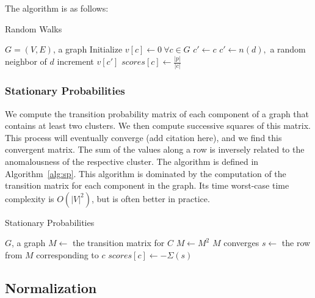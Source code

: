 The algorithm is as follows:

\begin{algorithm}[h]
    \caption{Random Walks}
    \label{alg:rw}
\begin{algorithmic}[1]
    \REQUIRE $G = (V,E)$, a graph
    \STATE Initialize $v[c] \gets 0 \ \forall c \in G$
        \STATE $c' \gets c$
            \STATE $c' \gets n(d),$ a random neighbor of $d$
            \STATE increment $v[c']$
        \ENDFOR
    \ENDFOR
        \STATE $scores[c] \gets \frac{|p|}{|c|}$
    \ENDFOR
\end{algorithmic}
\end{algorithm}

\subsubsection{Stationary Probabilities}
We compute the transition probability matrix of each component of a graph that contains at least two clusters.
We then compute successive squares of this matrix. %
This process will eventually converge (add citation here), and we find this convergent matrix.
The sum of the values along a row is inversely related to the anomalousness of the respective cluster.
The algorithm is defined in Algorithm~\ref{alg:sp}.
This algorithm is dominated by the computation of the transition matrix for each component in the graph.
Its time worst-case time complexity is $O(|V|^2)$, but is often better in practice.

\begin{algorithm}[h]
    \caption{Stationary Probabilities}
    \label{alg:sp}
\begin{algorithmic}[1]
    \REQUIRE $G$, a graph
        \STATE $M \gets$ the transition matrix for $C$
        \REPEAT
            \STATE $M \gets M^2$
        \UNTIL $M$ converges
            \STATE $s \gets $ the row from $M$ corresponding to $c$
            \STATE $scores[c] \gets -\Sigma(s)$ 
        \ENDFOR
    \ENDFOR
\end{algorithmic}
\end{algorithm}


\subsection{Normalization}
\label{subsec:methods:normalization}

